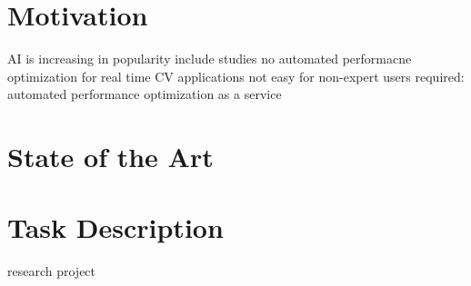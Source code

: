 \section{Motivation}
AI is increasing in popularity
include studies
no automated performacne optimization for real time CV applications
not easy for non-expert users
required: automated performance optimization as a service
\section{State of the Art}
\cite{Test.2019}
\section{Task Description}
research project